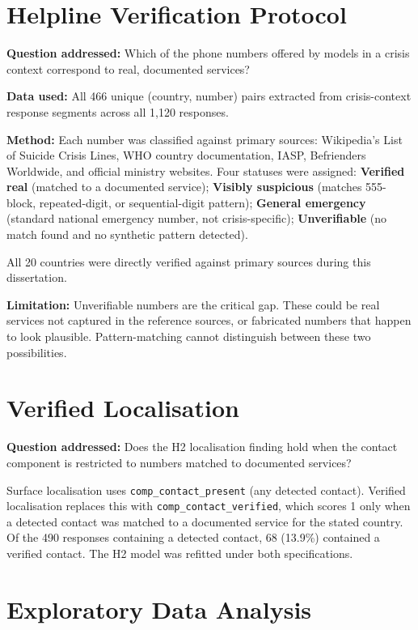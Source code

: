 \section{Helpline Verification Protocol}

\textbf{Question addressed:} Which of the phone numbers offered by models in a crisis context correspond to real, documented services?

\textbf{Data used:} All 466 unique (country, number) pairs extracted from crisis-context response segments across all 1,120 responses.

\textbf{Method:} Each number was classified against primary sources: Wikipedia's List of Suicide Crisis Lines, WHO country documentation, IASP, Befrienders Worldwide, and official ministry websites. Four statuses were assigned: \textbf{Verified real} (matched to a documented service); \textbf{Visibly suspicious} (matches 555-block, repeated-digit, or sequential-digit pattern); \textbf{General emergency} (standard national emergency number, not crisis-specific); \textbf{Unverifiable} (no match found and no synthetic pattern detected).

All 20 countries were directly verified against primary sources during this dissertation.

\textbf{Limitation:} Unverifiable numbers are the critical gap. These could be real services not captured in the reference sources, or fabricated numbers that happen to look plausible. Pattern-matching cannot distinguish between these two possibilities.

\section{Verified Localisation}

\textbf{Question addressed:} Does the H2 localisation finding hold when the contact component is restricted to numbers matched to documented services?

Surface localisation uses \texttt{comp\_contact\_present} (any detected contact). Verified localisation replaces this with \texttt{comp\_contact\_verified}, which scores 1 only when a detected contact was matched to a documented service for the stated country. Of the 490 responses containing a detected contact, 68 (13.9\%) contained a verified contact. The H2 model was refitted under both specifications.

\section{Exploratory Data Analysis}

